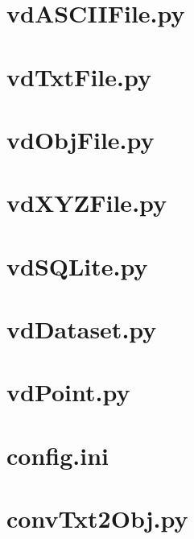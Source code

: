 \documentclass[a4paper,12pt,bibliography=totoc, listof=totoc,titlepage,pointlessnumbers]{scrreprt}
\begin{document}
\begin{appendices}
\section{vdASCIIFile.py}
\label{a:vdASCIIFile.py}


\section{vdTxtFile.py}
\label{a:vdTxtFile.py}


\section{vdObjFile.py}
\label{a:vdObjFile.py}


\section{vdXYZFile.py}
\label{a:vdXYZFile.py}


\section{vdSQLite.py}
\label{a:vdSQLite.py}


\section{vdDataset.py}
\label{a:vdDataset.py}


\section{vdPoint.py}
\label{a:vdPoint.py}


\section{config.ini}
\label{a:config.ini}


\section{convTxt2Obj.py}
\label{a:convToObj.py}



\end{appendices}
\end{document}
